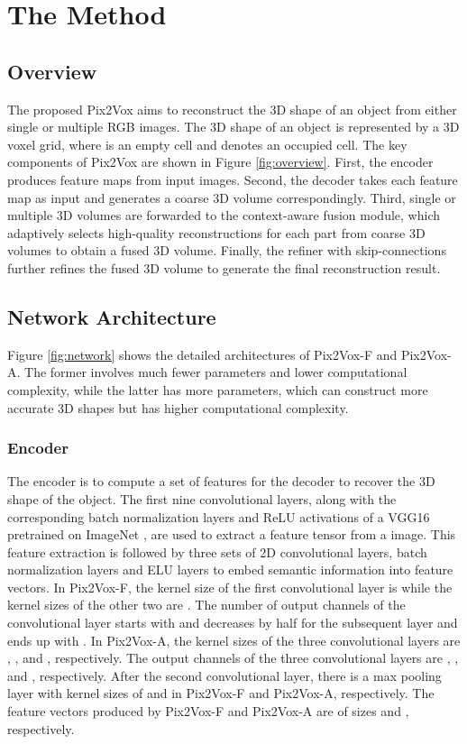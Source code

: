 \documentclass[10pt,twocolumn,letterpaper]{article}
\begin{document}
\section{The Method}

\subsection{Overview}

The proposed Pix2Vox aims to reconstruct the 3D shape of an object from either single or multiple RGB images. 
The 3D shape of an object is represented by a 3D voxel grid, where  is an empty cell and  denotes an occupied cell.
The key components of Pix2Vox are shown in Figure \ref{fig:overview}.
First, the encoder produces feature maps from input images.
Second, the decoder takes each feature map as input and generates a coarse 3D volume correspondingly.
Third, single or multiple 3D volumes are forwarded to the context-aware fusion module, which adaptively selects high-quality reconstructions for each part from coarse 3D volumes to obtain a fused 3D volume.
Finally, the refiner with skip-connections further refines the fused 3D volume to generate the final reconstruction result.

\subsection{Network Architecture}

Figure \ref{fig:network} shows the detailed architectures of Pix2Vox-F and Pix2Vox-A.
The former involves much fewer parameters and lower computational complexity, while the latter has more parameters, which can construct more accurate 3D shapes but has higher computational complexity.

\vspace{-3 mm}
\subsubsection{Encoder}
\vspace{-1 mm}
The encoder is to compute a set of features for the decoder to recover the 3D shape of the object.
The first nine convolutional layers, along with the corresponding batch normalization layers and ReLU activations of a VGG16 \cite{DBLP:conf/iclr/SimonyanZ14a} pretrained on ImageNet \cite{DBLP:conf/cvpr/DengDSLL009}, are used to extract a  feature tensor from a  image.
This feature extraction is followed by three sets of 2D convolutional layers, batch normalization layers and ELU layers to embed semantic information into feature vectors.
In Pix2Vox-F, the kernel size of the first convolutional layer is  while the kernel sizes of the other two are .
The number of output channels of the convolutional layer starts with  and decreases by half for the subsequent layer and ends up with .
In Pix2Vox-A, the kernel sizes of the three convolutional layers are , , and , respectively.
The output channels of the three convolutional layers are , , and , respectively.
After the second convolutional layer, there is a max pooling layer with kernel sizes of  and  in Pix2Vox-F and Pix2Vox-A, respectively.
The feature vectors produced by Pix2Vox-F and Pix2Vox-A are of sizes  and , respectively.
 
\end{document}
